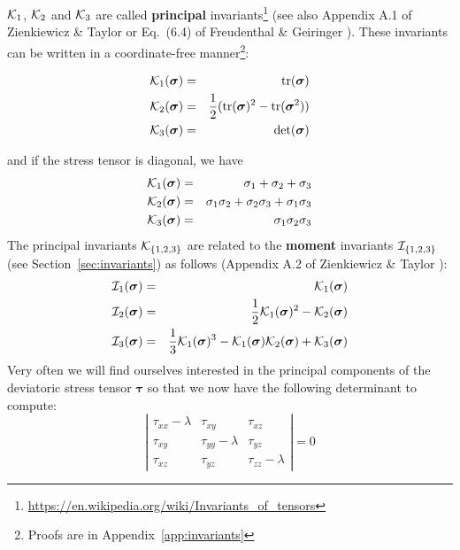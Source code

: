 
\noindent ${\cal K}_1$, ${\cal K}_2$ and ${\cal K}_3$ are called {\bf principal}
invariants\footnote{\url{https://en.wikipedia.org/wiki/Invariants_of_tensors}} 
(see also Appendix A.1 of Zienkiewicz \& Taylor \cite{zita2} or  Eq.~(6.4) of Freudenthal \& Geiringer \cite{frge58}). 
These invariants can be written in a coordinate-free manner\footnote{Proofs are in 
Appendix~\ref{app:invariants}}:
\begin{mdframed}[backgroundcolor=blue!5]
\begin{eqnarray}
{\cal K}_1({\bm \sigma}) &=& {\rm tr}({\bm \sigma})  \nonumber\\
{\cal K}_2({\bm \sigma}) &=& \frac{1}{2}(  {\rm tr}({\bm \sigma}) ^2 - {\rm tr}({\bm \sigma}^2)  ) \nonumber\\
{\cal K}_3({\bm \sigma}) &=& \det ({\bm \sigma}) \nonumber
\end{eqnarray}
\end{mdframed}
and if the stress tensor is diagonal, we have
\begin{eqnarray}
{\cal K}_1({\bm \sigma}) &=& \sigma_{1}+\sigma_{2}+\sigma_{3}\nonumber\\
{\cal K}_2({\bm \sigma}) &=& \sigma_{1}\sigma_{2}+\sigma_{2}\sigma_{3}+\sigma_{1}\sigma_{3} \nonumber\\
{\cal K}_3({\bm \sigma}) &=& \sigma_1\sigma_2\sigma_3 \nonumber
\end{eqnarray}
The principal invariants ${\cal K}_{\{1,2,3\}}$ are related to the {\bf moment} 
invariants ${\cal I}_{\{1,2,3\}}$ 
(see Section~\ref{sec:invariants}) as follows (Appendix A.2 of Zienkiewicz \& Taylor \cite{zita2}):
\begin{eqnarray}
{\cal I}_1({\bm \sigma})&=& {\cal K}_1({\bm \sigma}) \\ 
{\cal I}_2({\bm \sigma})&=& \frac{1}{2}{\cal K}_1({\bm \sigma})^2 -{\cal K}_2({\bm \sigma}) \label{eq:IK2}\\
{\cal I}_3({\bm \sigma})&=& \frac{1}{3}{\cal K}_1({\bm \sigma})^3 -{\cal K}_1({\bm \sigma}) 
{\cal K}_2({\bm \sigma}) + {\cal K}_3({\bm \sigma}) \label{eq:IK3}
\end{eqnarray}
Very often we will find ourselves interested in the principal components 
of the deviatoric stress tensor $\bm \tau$ so that we now have the following determinant to compute:
\[
\left|  
\begin{array}{ccc}
\tau_{xx}-\lambda & \tau_{xy} & \tau_{xz} \\
\tau_{xy} & \tau_{yy}-\lambda & \tau_{yz} \\
\tau_{xz} & \tau_{yz} & \tau_{zz} -\lambda
\end{array}
\right|
=0
\]
